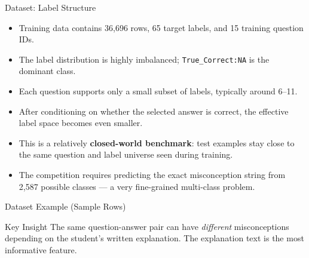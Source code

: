 ﻿\documentclass[aspectratio=169,10pt]{beamer}
\begin{document}
\begin{frame}{Dataset: Label Structure}
\begin{itemize}
  \item Training data contains 36,696 rows, 65 target labels, and 15 training question IDs.
  \item The label distribution is highly imbalanced; \texttt{True\_Correct:NA} is the dominant class.
  \item Each question supports only a small subset of labels, typically around 6--11.
  \item After conditioning on whether the selected answer is correct, the effective label space becomes even smaller.
  \item This is a relatively \textbf{closed-world benchmark}: test examples stay close to the same question and label universe seen during training.
  \item The competition requires predicting the exact misconception string from 2,587 possible classes --- a very fine-grained multi-class problem.
\end{itemize}
\end{frame}

\begin{frame}{Dataset Example (Sample Rows)}
\scriptsize
\setlength{\tabcolsep}{3pt}
\renewcommand{\arraystretch}{1.15}
\begin{table}
\centering
{}
\caption{Example records showing question text, selected answer, explanation, category, and misconception label.}
\end{table}
\vspace{-4pt}
\begin{exampleblock}{Key Insight}
The same question-answer pair can have \textit{different} misconceptions depending on the student's written explanation. The explanation text is the most informative feature.
\end{exampleblock}
\end{frame}
\end{document}
